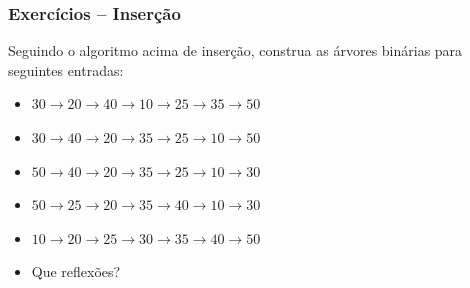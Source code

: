 
\begin{frame}[fragile]
\frametitle{Exercícios -- Inserção}

\begin{block}{}
Seguindo o algoritmo acima de inserção,
construa as árvores binárias para seguintes entradas:

\begin{itemize}
  \item $30 \rightarrow 20 \rightarrow 40 \rightarrow 10 \rightarrow 25 \rightarrow 35 \rightarrow 50$
    \item $30 \rightarrow 40 \rightarrow 20 \rightarrow 35 \rightarrow 25 \rightarrow 10 \rightarrow 50$
    \item $50 \rightarrow 40 \rightarrow 20 \rightarrow 35 \rightarrow 25 \rightarrow 10 \rightarrow 30$
    \item $50 \rightarrow 25 \rightarrow 20 \rightarrow 35 \rightarrow 40 \rightarrow 10 \rightarrow 30$
     \item $10 \rightarrow 20 \rightarrow 25 \rightarrow 30 \rightarrow 35 \rightarrow 40 \rightarrow 50$            
     \item Que reflexões?
   
\end{itemize}
\end{block}


\end{frame}

